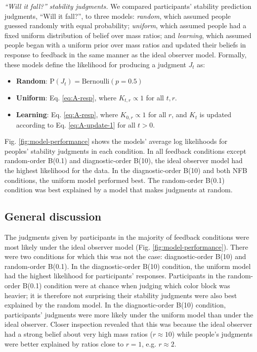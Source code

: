 \documentclass[10pt,letterpaper]{article}
\renewcommand{\Pr}[0]{\mathrm{P}}
\newcommand{\fblow}[0]{B(0.1)}
\newcommand{\fbhigh}[0]{B(10)}
\newcommand{\nfb}[0]{NFB}
\newcommand{\rand}[1]{random-order #1}
\newcommand{\diag}[1]{diagnostic-order #1}
\newenvironment{pitemize}{
\begin{itemize}
  \setlength{\itemsep}{1pt}
  \setlength{\parskip}{0pt}
  \setlength{\parsep}{0pt}
}{\end{itemize}}
\begin{document}
\textit{``Will it fall?'' stability judgments.} We compared
participants' stability prediction judgments, ``Will it fall?'', to
three models: \textit{random}, which assumed people guessed randomly
with equal probability; \textit{uniform}, which assumed people had a
fixed uniform distribution of belief over mass ratios; and
\textit{learning}, which assumed people began with a uniform prior
over mass ratios and updated their beliefs in response to feedback in
the same manner as the ideal observer model. Formally, these models
define the likelihood for producing a judgment $J_t$ as:
\begin{pitemize}
\item \textbf{Random}: $\Pr(J_t)=\textrm{Bernoulli}(p=0.5)$
\item \textbf{Uniform}: Eq. \ref{eq:A-resp}, where
  $K_{t,r}\propto 1$ for all $t,r$.
\item \textbf{Learning}: Eq. \ref{eq:A-resp},
  where $K_{0,r}\propto 1$ for all $r$, and $K_t$ is updated according
  to Eq. \ref{eq:A-update-1} for all $t>0$.
\end{pitemize}

Fig. \ref{fig:model-performance} shows the models' average log
likelihoods for peoples' stability judgments in each condition. In all
feedback conditions except \rand{\fblow{}} and \diag{\fbhigh{}}, the
ideal observer model had the highest likelihood for the data. In the
\diag{\fbhigh{}} and both \nfb{} conditions, the uniform model
performed best. The \rand{\fblow{}} condition was best explained by a
model that makes judgments at random.


\subsection{General discussion}


The judgments given by participants in the majority of feedback
conditions were most likely under the ideal observer model (Fig.
\ref{fig:model-performance}). There were two conditions for which this
was not the case: \diag{\fbhigh{}} and \rand{\fblow{}}. In the
\diag{\fbhigh{}} condition, the uniform model had the highest
likelihood for participants' responses. Participants in the
\rand{\fblow{}} condition were at chance when judging which color
block was heavier; it is therefore not surprising their stability
judgments were also best explained by the random model. In the
\diag{\fbhigh{}} condition, participants' judgments were more likely
under the uniform model than under the ideal observer. Closer
inspection revealed that this was because the ideal observer had a
strong belief about very high mass ratios ($r\approx 10$) while
people's judgments were better explained by ratios close to $r=1$,
e.g. $r\approx 2$.
\end{document}
